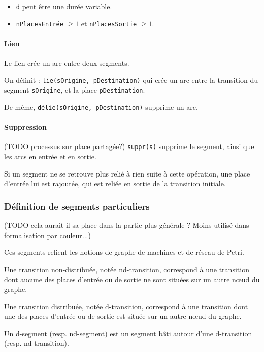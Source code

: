 \begin{itemize}
\item \texttt{d} peut être une durée variable.
\item \texttt{nPlacesEntrée} $ \geq 1 $ et \texttt{nPlacesSortie} $ \geq 1 $.
\end{itemize}
\paragraph{Lien}
Le lien crée un arc entre deux segments.

On définit : \texttt{lie(sOrigine, pDestination)} qui crée un arc entre la transition du segment \texttt{sOrigine}, et la place \texttt{pDestination}.

De même, \texttt{délie(sOrigine, pDestination)} supprime un arc.

\paragraph{Suppression}
(TODO processus sur place partagée?)
\texttt{suppr(s)} supprime le segment, ainsi que les arcs en entrée et en sortie.

Si un segment ne se retrouve plus relié à rien suite à cette opération, une place d'entrée lui est rajoutée, qui est reliée en sortie de la transition initiale.

\subsubsection{Définition de segments particuliers}
(TODO cela aurait-il sa place dans la partie plus générale ? Moins utilisé dans formalisation par couleur...)

Ces segments relient les notions de graphe de machines et de réseau de Petri.
\begin{mydef}
Une transition non-distribuée, notée nd-transition, correspond à une transition dont aucune des places d'entrée ou de sortie ne sont situées sur un autre nœud du graphe.
\end{mydef}

\begin{mydef}
Une transition distribuée, notée d-transition, correspond à une transition dont une des places d'entrée ou de sortie est située sur un autre nœud du graphe.
\end{mydef}

\begin{mydef}
Un d-segment (resp. nd-segment) est un segment bâti autour d'une d-transition (resp. nd-transition).
\end{mydef}

